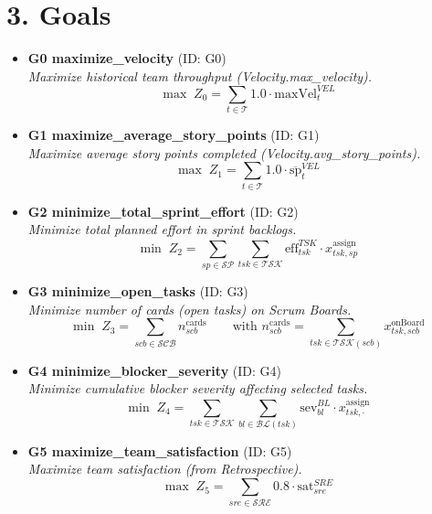 \documentclass[11pt,a4paper]{article}
\begin{document}
\section{3. Goals}
\begin{itemize}[leftmargin=2em]
  \item \textbf{G0 maximize\_velocity} \; (ID: G0)\\
  \emph{Maximize historical team throughput (Velocity.max\_velocity).}\\
  \[
    \max \; Z_{0} = \sum_{t \in \mathcal{T}} 1.0 \cdot \text{maxVel}^{VEL}_{t}
  \]

  \item \textbf{G1 maximize\_average\_story\_points} \; (ID: G1)\\
  \emph{Maximize average story points completed (Velocity.avg\_story\_points).}\\
  \[
    \max \; Z_{1} = \sum_{t \in \mathcal{T}} 1.0 \cdot \overline{\text{sp}}^{VEL}_{t}
  \]

  \item \textbf{G2 minimize\_total\_sprint\_effort} \; (ID: G2)\\
  \emph{Minimize total planned effort in sprint backlogs.}\\
  \[
    \min \; Z_{2} = \sum_{sp \in \mathcal{SP}} \sum_{tsk \in \mathcal{TSK}} \text{eff}^{TSK}_{tsk} \cdot x^{\text{assign}}_{tsk,sp}
  \]

  \item \textbf{G3 minimize\_open\_tasks} \; (ID: G3)\\
  \emph{Minimize number of cards (open tasks) on Scrum Boards.}\\
  \[
    \min \; Z_{3} = \sum_{scb \in \mathcal{SCB}} n^{\text{cards}}_{scb}
    \qquad \text{with } n^{\text{cards}}_{scb} = \sum_{tsk \in \mathcal{TSK}(scb)} x^{\text{onBoard}}_{tsk,scb}
  \]

  \item \textbf{G4 minimize\_blocker\_severity} \; (ID: G4)\\
  \emph{Minimize cumulative blocker severity affecting selected tasks.}\\
  \[
    \min \; Z_{4} = \sum_{tsk \in \mathcal{TSK}} \sum_{bl \in \mathcal{BL}(tsk)} \text{sev}^{BL}_{bl} \cdot x^{\text{assign}}_{tsk,\cdot}
  \]

  \item \textbf{G5 maximize\_team\_satisfaction} \; (ID: G5)\\
  \emph{Maximize team satisfaction (from Retrospective).}\\
  \[
    \max \; Z_{5} = \sum_{sre \in \mathcal{SRE}} 0.8 \cdot \text{sat}^{SRE}_{sre}
  \]


\end{itemize}
\end{document}
